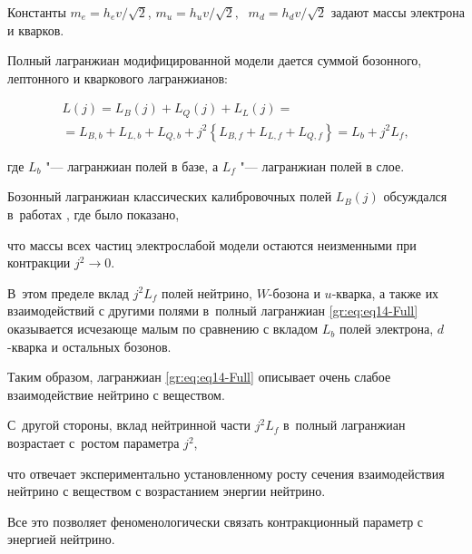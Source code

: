 Константы  $m_e=h_ev/\sqrt{2}$,  $m_u=h_uv/\sqrt{2},\;$ $ m_d=h_dv/\sqrt{2} $ задают массы электрона и кварков.





Полный лагранжиан модифицированной модели дается суммой бозонного, лептонного и кваркового лагранжианов:

\begin{multline}

L(j)=L_B(j) + L_Q(j) + L_L(j)=

\\

=L_{B,b}+ L_{L,b}+ L_{Q,b} + j^2\left\{L_{B,f}+ L_{L,f}+ L_{Q,f} \right\} %

 =L_b + j^2L_{f},

\label{gr:eq:eq14-Full}

\end{multline}

где  $L_b  $ "--- лагранжиан полей в базе, а  $L_{f} $ "--- лагранжиан полей в слое.



Бозонный лагранжиан  классических калибровочных полей  $L_B(j)$ обсуждался в~работах \cite{gromov:Gr-2010, gromov:Gr-2011}, где было показано, 

что массы всех частиц электрослабой модели остаются неизменными при контракции $j^2\rightarrow 0$.

В~этом пределе вклад $j^2L_{f}$ полей нейтрино, $W$-бозона и $u$-кварка, а также их взаимодействий с другими полями в~полный лагранжиан \eqref{gr:eq:eq14-Full} оказывается исчезающе малым по сравнению с вкладом $L_b$ полей электрона, $d$-кварка и остальных бозонов. 

Таким образом, лагранжиан \eqref{gr:eq:eq14-Full} описывает очень слабое взаимодействие нейтрино с веществом. 

С~другой стороны,  вклад нейтринной части $j^2L_{f}$ в~полный лагранжиан возрастает с~ростом параметра  $j^2$, 

что отвечает экспериментально установленному росту сечения взаимодействия нейтрино с веществом с возрастанием энергии нейтрино. 

Все это позволяет феноменологически связать контракционный параметр с энергией нейтрино.










